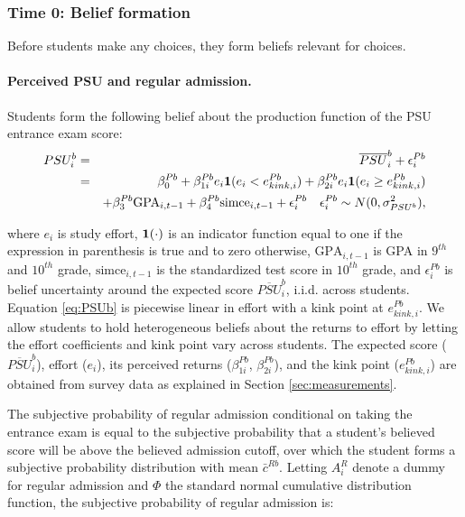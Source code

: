 \subsubsection{Time 0: Belief formation}\label{sec:belief_formation}
Before students make any choices, they form beliefs relevant for choices.  \par 

\paragraph{Perceived PSU and regular admission.} Students form the following belief about the production function of the PSU entrance exam score:
\begin{eqnarray}\label{eq:PSUb} PSU^b_{i}&=&\overline{PSU}^b_{i}+\epsilon_{i}^{Pb}\\ \nonumber   &=& \beta^{Pb}_0+\beta^{Pb}_{1i}e_i {\bf 1}(e_i< e^{Pb}_{kink,i})+\beta^{Pb}_{2i}e_i {\bf 1}(e_i\geq  e^{Pb}_{kink,i}) \\ \nonumber 
&& +\beta^{Pb}_{3}\mbox{GPA}_{i,t-1} +\beta^{Pb}_{4}\mbox{simce}_{i,t-1}+\epsilon_{i}^{Pb} \quad \epsilon_{i}^{Pb} \sim N(0,\sigma^2_{PSU^b}),
\end{eqnarray} 

\noindent where $e_i$ is study effort, ${\bf 1}(\cdot)$ is an indicator function equal to one if the expression in parenthesis is true and to zero otherwise, $\mbox{GPA}_{i,t-1}$ is GPA in $9^{th}$ and $10^{th}$ grade, $\mbox{simce}_{i,t-1}$ is the standardized test score in $10^{th}$ grade, and $\epsilon_{i}^{Pb}$ is belief uncertainty around the expected score $\overline{PSU}^b_{i}$, i.i.d. across students. Equation \eqref{eq:PSUb} is piecewise linear in effort with a kink point at $e^{Pb}_{kink,i}$. We allow students to hold heterogeneous beliefs about the returns to effort by letting the effort coefficients and kink point vary across students. The expected score ($\overline{PSU}_i^b$), effort ($e_i$), its perceived returns ($\beta_{1i}^{Pb}$, $\beta_{2i}^{Pb}$), and the kink point ($e^{Pb}_{kink,i}$) are obtained from survey data as explained in Section \ref{sec:measurements}. \par 
The subjective probability of regular admission conditional on taking the entrance exam is equal to the subjective probability that a student's believed score will be above the believed admission cutoff, over which the student forms a subjective probability distribution with mean  $\bar{c}^{Rb}$. Letting $A^R_i$ denote a dummy for regular admission and $\Phi$ the standard normal cumulative distribution function, the subjective probability of regular admission is:

